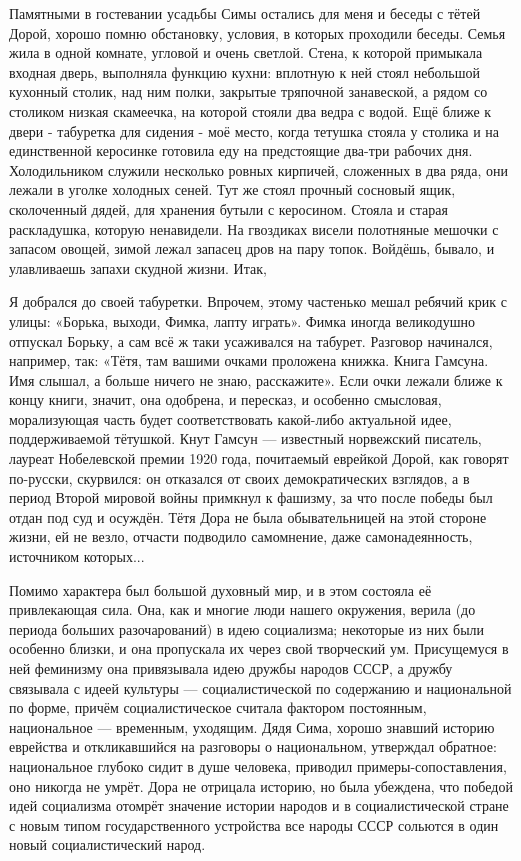 Памятными в гостевании усадьбы Симы остались для меня и беседы с тётей Дорой, хорошо помню обстановку, условия, в которых проходили беседы. Семья жила в одной комнате, угловой и очень светлой. Стена, к которой примыкала входная дверь, выполняла функцию кухни: вплотную к ней стоял небольшой кухонный столик, над ним полки, закрытые тряпочной занавеской, а рядом со столиком низкая скамеечка, на которой стояли два ведра с водой. Ещё ближе к двери - табуретка для сидения - моё место, когда тетушка стояла у столика и на единственной керосинке готовила еду на предстоящие два-три рабочих дня. Холодильником служили несколько ровных кирпичей, сложенных в два ряда, они лежали в уголке холодных сеней. Тут же стоял прочный сосновый ящик, сколоченный дядей, для хранения бутыли с керосином. Стояла и старая раскладушка, которую ненавидели. На гвоздиках висели полотняные мешочки с запасом овощей, зимой лежал запасец дров на пару топок. Войдёшь, бывало, и улавливаешь запахи скудной жизни. Итак,

Я добрался до своей табуретки. Впрочем, этому частенько мешал ребячий крик с улицы: «Борька, выходи, Фимка, лапту играть». Фимка иногда великодушно отпускал Борьку, а сам всё ж таки усаживался на табурет. Разговор начинался, например, так: «Тётя, там вашими очками проложена книжка. Книга Гамсуна. Имя слышал, а больше ничего не знаю, расскажите». Если очки лежали ближе к концу книги, значит, она одобрена, и пересказ, и особенно смысловая, морализующая часть будет соответствовать какой-либо актуальной идее, поддерживаемой тётушкой. Кнут Гамсун — известный норвежский писатель, лауреат Нобелевской премии 1920 года, почитаемый еврейкой Дорой, как говорят по-русски, скурвился: он отказался от своих демократических взглядов, а в период Второй мировой войны примкнул к фашизму, за что после победы был отдан под суд и осуждён. Тётя Дора не была обывательницей на этой стороне жизни, ей не везло, отчасти подводило самомнение, даже самонадеянность, источником которых...

Помимо характера был большой духовный мир, и в этом состояла её привлекающая сила. Она, как и многие люди нашего окружения, верила (до периода больших разочарований) в идею социализма; некоторые из них были особенно близки, и она пропускала их через свой творческий ум. Присущемуся в ней феминизму она привязывала идею дружбы народов СССР, а дружбу связывала с идеей культуры — социалистической по содержанию и национальной по форме, причём социалистическое считала фактором постоянным, национальное — временным, уходящим. Дядя Сима, хорошо знавший историю еврейства и откликавшийся на разговоры о национальном, утверждал обратное: национальное глубоко сидит в душе человека, приводил примеры-сопоставления, оно никогда не умрёт. Дора не отрицала историю, но была убеждена, что победой идей социализма отомрёт значение истории народов и в социалистической стране с новым типом государственного устройства все народы СССР сольются в один новый социалистический народ.

